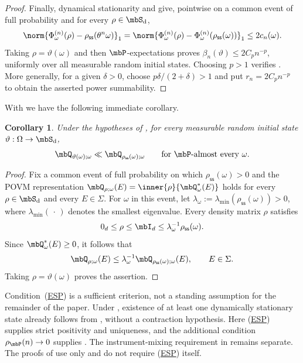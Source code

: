 \documentclass[a4paper]{article}
\numberwithin{equation}{section}   %
\theoremstyle{plain}   %
\theoremstyle{plain}   %
\newtheorem{cor}[lemma]{Corollary}   %
\theoremstyle{examplestyle}
\DeclareMathOperator{\states}{\mbS_d}   %
\DeclareMathOperator{\pr}{\mbP}           %
\newcommand{\s}{\rho_{\mathsf{ss}}}     %
\newcommand{\esp}{{\hyperlink{esp}{ESP}}}
\begin{document}
\begin{proof}
        Finally, dynamical stationarity and  give, pointwise on a common event of full probability and for every
        \(\rho\in\states\),
        \[
            \norm{\Phi_\omega^{(n)}(\rho)-\s(\theta^n\omega)}_1
            =\norm{\Phi_\omega^{(n)}(\rho)
                   -\Phi_\omega^{(n)}(\s(\omega))}_1
            \le2c_n(\omega).
        \]
        Taking \(\rho=\vartheta(\omega)\) and then $\mbP$-expectations proves \(\beta_n(\vartheta)\le2C_pn^{-p}\), uniformly over all measurable random initial states.
        Choosing \(p>1\) verifies . 
        More generally, for a given \(\delta>0\), choose \(p\delta/(2+\delta)>1\) and put \(r_n=2C_pn^{-p}\) to obtain the asserted power summability.
    \end{proof}

    With  we have the following immediate corollary. 
    
    \begin{cor}
    \label{cor:quenched_absolute_continuity}
        Under the hypotheses of , for every measurable random initial state \(\vartheta:\Omega\to\states\),
        \[
            \mbQ_{\vartheta(\omega);\omega}
            \ll\mbQ_{\s(\omega);\omega}
            \qquad\text{for \(\pr\)-almost every \(\omega\)}.
        \]
    \end{cor}
    \begin{proof}
        Fix a common event of full probability on which \(\s(\omega)>0\) and the POVM representation \(\mbQ_{\rho;\omega}(E)=\inner{\rho}{\mbQ^*_\omega(E)}\) holds for every \(\rho\in\states\) and every \(E\in\Sigma\).
        For \(\omega\) in this event, let \(\lambda_\omega:=\lambda_{\min}(\s(\omega))>0\), where $\lambda_{\min}(\,\cdot\,)$ denotes the smallest eigenvalue. 
        Every density matrix \(\rho\) satisfies
        \[
            0_d\le\rho\le\mbI_d\le\lambda_\omega^{-1}\s(\omega).
        \]
        Since \(\mbQ^*_\omega(E)\ge0\), it follows that
        \[
            \mbQ_{\rho;\omega}(E)
            \le\lambda_\omega^{-1}\mbQ_{\s(\omega);\omega}(E),
            \qquad E\in\Sigma.
        \]
        Taking \(\rho=\vartheta(\omega)\) proves the assertion.
    \end{proof}

    Condition~(\esp) is a sufficient criterion, not a standing assumption for the remainder of the paper. 
    Under , existence of at least one dynamically stationary state already follows from \Cite{Beck_1957}, without a contraction hypothesis.
    Here (\esp) supplies strict positivity and uniqueness, and the additional condition \(\rho_{\pr}(n)\to0\) supplies . 
    The instrument-mixing requirement in  remains separate. 
    The proofs of  use only  and do not require (\esp) itself.
\end{document}
